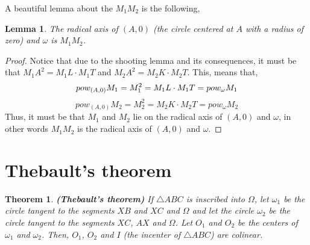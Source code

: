 \documentclass{article}
\newtheorem{theorem}{Theorem}
\newtheorem{lemma}{Lemma}
\begin{document}
A beautiful lemma about the \(M_1 M_2\) is the following,

\begin{lemma}
The radical axis of \((A,0)\) (the circle centered at \(A\) with a radius of zero) and \(\omega\) is \(M_1 M_2\).
\end{lemma}

\begin{proof}
Notice that due to the shooting lemma and its consequences, it must be that \(M_1A^2 = M_1 L \cdot M_1 T\) and \(M_2 A^2 = M_2 K \cdot M_2 T\). This, means that,
\begin{equation}
pow_{(A,0)} M_1 = M_1^2 = M_1 L \cdot M_1 T = pow_{\omega} M_1 \\
\end{equation}
\begin{equation}
pow_{(A,0)} M_2 = M_2^2 = M_2 K \cdot M_2 T = pow_{\omega} M_2
\end{equation}
Thus, it must be that \(M_1\) and \(M_2\) lie on the radical axis of \((A,0)\) and \(\omega\), in other words \(M_1 M_2\) is the radical axis of \((A,0)\) and \(\omega\).

\end{proof}

\section{Thebault's theorem}

\begin{theorem} \textbf{(Thebault's theorem)}
If \(\triangle ABC\) is inscribed into \(\Omega\), let \(\omega_1\) be the circle tangent to the segments \(XB\) and \(XC\) and \(\Omega\) and let the circle \(\omega_2\) be the circle tangent to the segments \(XC\), \(AX\) and \(\Omega\). Let \(O_1\) and \(O_2\) be the centers of \(\omega_1\) and \(\omega_2\). Then, \(O_1\), \(O_2\) and \(I\) (the incenter of \(\triangle ABC\)) are colinear.
\end{theorem}
\end{document}
